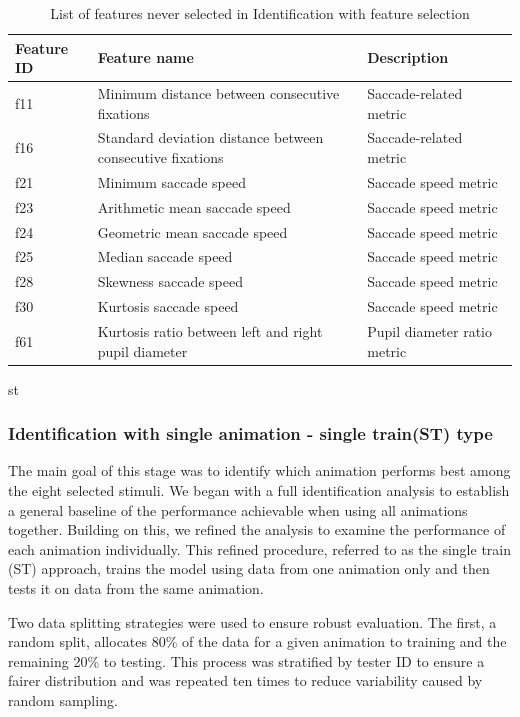 \documentclass{article}
\begin{document}
\begin{table}[H]
\centering
\small
\setlength{\tabcolsep}{4pt} %
\caption{List of features never selected in Identification with feature selection}
\label{tab:ns_id}
\begin{tabular}{lll}
\toprule
\textbf{Feature ID} & \textbf{Feature name} & \textbf{Description} \\
\midrule
f11 & Minimum distance between consecutive fixations & Saccade-related metric \\
f16 & Standard deviation distance between consecutive fixations & Saccade-related metric \\
f21 & Minimum saccade speed & Saccade speed metric \\
f23 & Arithmetic mean saccade speed & Saccade speed metric \\
f24 & Geometric mean saccade speed & Saccade speed metric \\
f25 & Median saccade speed & Saccade speed metric \\
f28 & Skewness saccade speed & Saccade speed metric \\
f30 & Kurtosis saccade speed & Saccade speed metric \\
f61 & Kurtosis ratio between left and right pupil diameter & Pupil diameter ratio metric \\
\bottomrule
\end{tabular}st
\end{table}

\subsubsection{Identification with single animation - single train(ST) type}
\label{subsec:id_s_st}

The main goal of this stage was to identify which animation performs best among the eight selected stimuli. 
We began with a full identification analysis to establish a general baseline of the performance achievable when using all animations together. 
Building on this, we refined the analysis to examine the performance of each animation individually. 
This refined procedure, referred to as the single train (ST) approach, trains the model using data from one animation only and then tests it on data from the same animation.

Two data splitting strategies were used to ensure robust evaluation. 
The first, a random split, allocates 80\% of the data for a given animation to training and the remaining 20\% to testing.
This process was stratified by tester ID to ensure a fairer distribution and was repeated ten times to reduce variability caused by random sampling.
\end{document}
